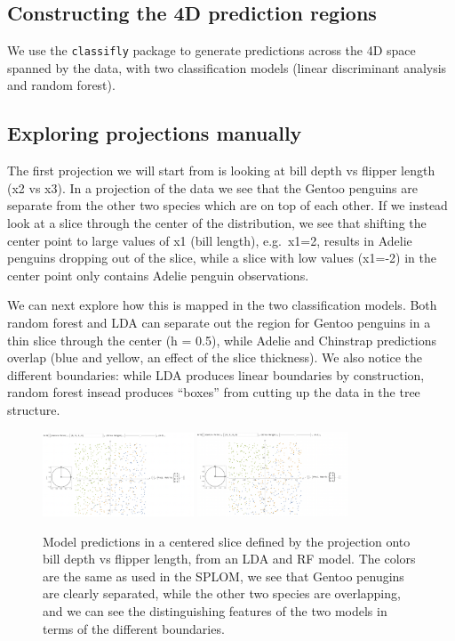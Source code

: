 \documentclass[]{interact}
\theoremstyle{plain}%
\theoremstyle{definition}
\theoremstyle{remark}
\begin{document}
\hypertarget{constructing-the-4d-prediction-regions}{%
\subsection{Constructing the 4D prediction
regions}\label{constructing-the-4d-prediction-regions}}

We use the \texttt{classifly} package \citep{classifly} to generate
predictions across the 4D space spanned by the data, with two
classification models (linear discriminant analysis and random forest).

\hypertarget{exploring-projections-manually}{%
\subsection{Exploring projections
manually}\label{exploring-projections-manually}}

The first projection we will start from is looking at bill depth vs
flipper length (x2 vs x3). In a projection of the data we see that the
Gentoo penguins are separate from the other two species which are on top
of each other. If we instead look at a slice through the center of the
distribution, we see that shifting the center point to large values of
x1 (bill length), e.g.~x1=2, results in Adelie penguins dropping out of
the slice, while a slice with low values (x1=-2) in the center point
only contains Adelie penguin observations.

We can next explore how this is mapped in the two classification models.
Both random forest and LDA can separate out the region for Gentoo
penguins in a thin slice through the center (h = 0.5), while Adelie and
Chinstrap predictions overlap (blue and yellow, an effect of the slice
thickness). We also notice the different boundaries: while LDA produces
linear boundaries by construction, random forest insead produces
``boxes'' from cutting up the data in the tree structure.

\begin{figure}[ht]
\centerline{\includegraphics[width=0.4\textwidth]{figures/view1_lda.png}
\includegraphics[width=0.4\textwidth]{figures/view1_rf.png}}
\caption{Model predictions in a centered slice defined by the projection onto bill depth vs flipper length, from an LDA and RF model. The colors are the same as used in the SPLOM, we see that Gentoo penugins are clearly separated, while the other two species are overlapping, and we can see the distinguishing features of the two models in terms of the different boundaries.}
\label{view1}
\end{figure}
\end{document}
